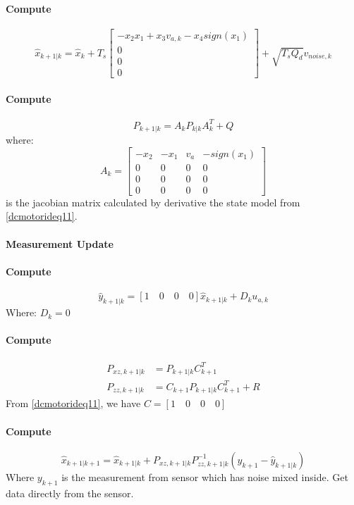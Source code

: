 	\paragraph{Compute} \[\hat{x}_{k+1|k} = \hat{x}_k + T_s
	\begin{bmatrix}
		-x_2 x_1 + x_3 v_{a,k} - x_4sign(x_1) \\
		0                                     \\
		0                                     \\
		0                                     
	\end{bmatrix} + \boxed{\sqrt{T_s Q_d}v_{noise,k}}\]
	\paragraph{Compute}
	\[P_{k+1|k} = A_kP_{k|k}A^T_k+Q\]
	where:
	\[A_k =
	\begin{bmatrix}
		-x_2 & -x_1 & v_a & -sign(x_1) \\
		0    & 0    & 0   & 0          \\
		0    & 0    & 0   & 0          \\
		0    & 0    & 0   & 0          
	\end{bmatrix}\]
	is the jacobian matrix calculated by derivative the state model from \autoref{dcmotorideq11}.
	\\
	\paragraph{Measurement Update}
	\paragraph{Compute}
	\[\hat{y}_{k+1|k} = [1\quad 0\quad 0\quad 0]\hat{x}_{k+1|k} + D_ku_{a,k}\]
	Where: \(D_k = 0\)
	\paragraph{Compute} \[
	\begin{split}
		P_{xz,k+1|k} &= P_{k+1|k}C^T_{k+1}\\
		P_{zz,k+1|k} &= C_{k+1}P_{k+1|k}C^T_{k+1}+R
	\end{split}\]
	From \autoref{dcmotorideq11}, we have \(C = [1\quad 0\quad 0\quad 0]\)
	
	\paragraph{Compute}
	\[\hat{x}_{k+1|k+1} = \hat{x}_{k+1|k} + P_{xz,k+1|k}P^{-1}_{zz,k+1|k}(y_{k+1}-\hat{y}_{k+1|k})\]
	Where \(y_{k+1}\) is the measurement from sensor which has noise mixed inside. Get data directly from the sensor.

